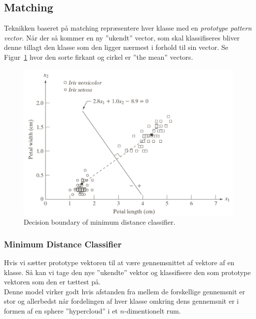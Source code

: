 \subsection{Matching}

Teknikken baseret på matching repræsentere hver klasse med en \textit{prototype pattern vector}. Når der så kommer en ny ''ukendt'' vector, som skal klassifiseres bliver denne tillagt den klasse som den ligger nærmest i forhold til sin vector. Se Figur~\ref{fig:decision-boundary} hvor den sorte firkant og cirkel er ''the mean'' vectors.

\begin{figure}[h]
	\centering
	\includegraphics[width=0.9\linewidth]{figs/spm12/decision-boundary}
	\caption{Decision boundary of minimum distance classifier.}
	\label{fig:decision-boundary}
\end{figure}

\subsubsection{Minimum Distance Classifier}

Hvis vi sætter prototype vektoren til at være gennemsnittet af vektore af en klasse. Så kan vi tage den nye ''ukendte'' vektor og klassifisere den som prototype vektoren som den er tættest på.\\

Denne model virker godt hvis afstanden fra mellem de forskellige gennemsnit er stor og allerbedst når fordelingen af hver klasse omkring dens gennemsnit er i formen af en sphere ''hypercloud'' i et $n$-dimentionelt rum.
